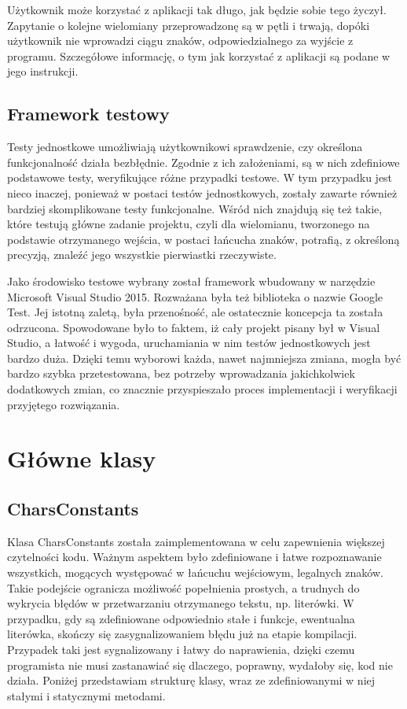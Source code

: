 \documentclass[twoside,a4paper]{book}
\begin{document}
Użytkownik może korzystać z aplikacji tak długo, jak będzie sobie tego życzył. Zapytanie o kolejne wielomiany przeprowadzonę są w pętli i trwają, dopóki użytkownik nie wprowadzi ciągu znaków, odpowiedzialnego za wyjście z programu. Szczegółowe informację, o tym jak korzystać z aplikacji są podane w jego instrukcji.

\subsection{Framework testowy}
Testy jednostkowe umożliwiają użytkownikowi sprawdzenie, czy określona funkcjonalność działa bezbłędnie. Zgodnie z ich założeniami, są w nich zdefiniowe podstawowe testy, weryfikujące różne przypadki testowe. W tym przypadku jest nieco inaczej, ponieważ w postaci testów jednostkowych, zostały zawarte również bardziej skomplikowane testy funkcjonalne. Wśród nich znajdują się też takie, które testują główne zadanie projektu, czyli dla wielomianu, tworzonego na podstawie otrzymanego wejścia, w postaci łańcucha znaków, potrafią, z określoną precyzją, znaleźć jego wszystkie pierwiastki rzeczywiste.

Jako środowisko testowe wybrany został framework wbudowany w narzędzie Microsoft Visual Studio 2015. Rozważana była też biblioteka o nazwie Google Test. Jej istotną zaletą, była przenośność, ale ostatecznie koncepcja ta została odrzucona. Spowodowane było to faktem, iż cały projekt pisany był w Visual Studio, a łatwość i wygoda, uruchamiania w nim testów jednostkowych jest bardzo duża. Dzięki temu wyborowi każda, nawet najmniejsza zmiana, mogła być bardzo szybka przetestowana, bez potrzeby wprowadzania jakichkolwiek dodatkowych zmian, co znacznie przyspieszało proces implementacji i weryfikacji przyjętego rozwiązania.

\section{Główne klasy}

\subsection{CharsConstants}

Klasa CharsConstants została zaimplementowana w celu zapewnienia większej czytelności kodu. Ważnym aspektem było zdefiniowane i łatwe rozpoznawanie wszystkich, mogących występować w łańcuchu wejściowym, legalnych znaków. Takie podejście ogranicza możliwość popełnienia prostych, a trudnych do wykrycia błędów w przetwarzaniu otrzymanego tekstu, np. literówki. W przypadku, gdy są zdefiniowane odpowiednio stałe i funkcje, ewentualna literówka, skończy się zasygnalizowaniem błędu już na etapie kompilacji. Przypadek taki jest sygnalizowany i łatwy do naprawienia, dzięki czemu programista nie musi zastanawiać się dlaczego, poprawny, wydałoby się, kod nie działa. Poniżej przedstawiam strukturę klasy, wraz ze zdefiniowanymi w niej stałymi i statycznymi metodami. 
\end{document}
